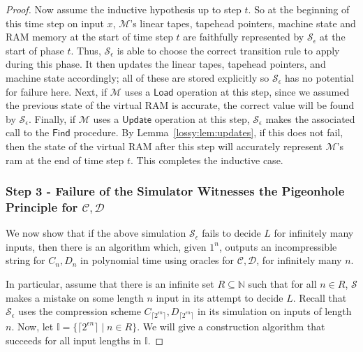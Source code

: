 \begin{proof}
Now assume the inductive hypothesis up to step $t$. So at the beginning of this time step on input $x$, $\mathcal{M}$'s linear tapes, tapehead pointers, machine state and RAM memory at the start of time step $t$ are faithfully represented by $\mathcal{S}_{\epsilon}$ at the start of phase $t$. Thus, $\mathcal{S}_{\epsilon}$ is able to choose the correct transition rule to apply during this phase. It then updates the linear tapes, tapehead pointers, and machine state accordingly; all of these are stored explicitly so $\mathcal{S}_{\epsilon}$ has no potential for failure here. Next, if $\mathcal{M}$ uses a $\mathsf{Load}$ operation at this step, since we assumed the previous state of the virtual RAM is accurate, the correct value will be found by $\mathcal{S}_{\epsilon}$. Finally, if $\mathcal{M}$ uses a $\mathsf{Update}$ operation at this step, $\mathcal{S}_{\epsilon}$ makes the associated call to the $\mathsf{Find}$ procedure. By Lemma~\ref{lossy:lem:updates}, if this does not fail, then the state of the virtual RAM after this step will accurately represent $\mathcal{M}$'s ram at the end of time step $t$. This completes the inductive case.

\subsubsection*{Step 3 - Failure of the Simulator Witnesses the Pigeonhole Principle for $\mathcal{C},\mathcal{D}$}

We now show that if the above simulation $\mathcal{S}_{\epsilon}$ fails to decide $L$ for infinitely many inputs, then there is an algorithm which, given $1^n$, outputs an incompressible string for $C_n,D_n$ in polynomial time using oracles for $\mathcal{C},\mathcal{D}$, for infinitely many $n$.

In particular, assume that there is an infinite set $R \subseteq \mathbb{N}$ such that for all $n \in R$, $\mathcal{S}$ makes a mistake on some length $n$ input in its attempt to decide $L$. Recall that $\mathcal{S}_{\epsilon}$ uses the compression scheme $C_{\lceil 2^{\epsilon n} \rceil}, D_{\lceil 2^{\epsilon n} \rceil}$ in its simulation on inputs of length $n$. Now, let $\mathbb{I} = \{\lceil 2^{\epsilon n} \rceil \mid n \in R\}$. We will give a construction algorithm that succeeds for all input lengths in $\mathbb{I}$. 


\end{proof}
